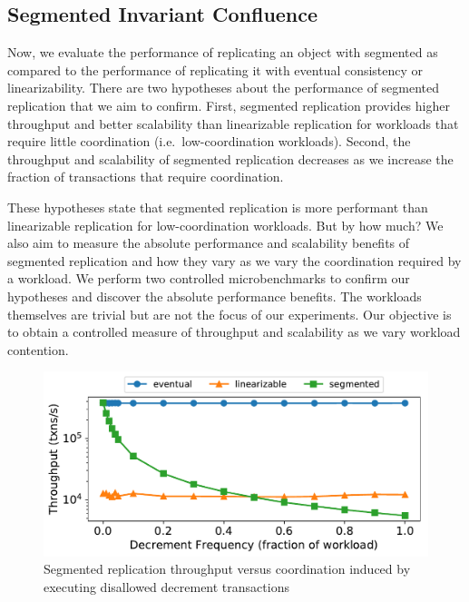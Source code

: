 \subsection{Segmented Invariant Confluence}%
Now, we evaluate the performance of replicating an object with segmented
\invariantconfluence{} as compared to the performance of replicating it with
eventual consistency or linearizability.
%
There are two hypotheses about the performance of segmented
\invariantconfluent{} replication that we aim to confirm.
%
First, segmented \invariantconfluent{} replication provides higher throughput
and better scalability than linearizable replication for workloads that
require little coordination (i.e.\ low-coordination workloads).
%
Second, the throughput and scalability of segmented \invariantconfluent{}
replication decreases as we increase the fraction of transactions that require
coordination.

These hypotheses state that segmented \invariantconfluent{} replication is more
performant than linearizable replication for low-coordination workloads. But by
how much?  We also aim to measure the absolute performance and scalability
benefits of segmented \invariantconfluent{} replication and how they vary as we
vary the coordination required by a workload. We perform two controlled
microbenchmarks to confirm our hypotheses and discover the absolute performance
benefits. The workloads themselves are trivial but are not the focus of our
experiments. Our objective is to obtain a controlled measure of throughput and
scalability as we vary workload contention.

\begin{figure}[t]
  \centering
  \includegraphics[width=\columnwidth]{figures/throughput_vs_fraction_16.pdf}
  \caption{%
    Segmented \invariantconfluent{} replication throughput versus coordination
    induced by executing disallowed decrement transactions
  }
\end{figure}

